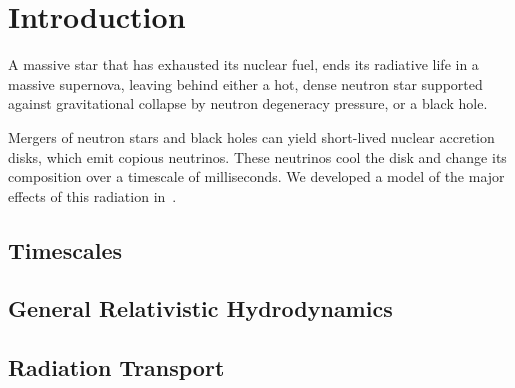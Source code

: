 \chapter{Introduction}
\label{chap:intro}

A massive star that has exhausted its nuclear fuel, ends its radiative life
in a massive supernova, leaving behind either a hot, dense neutron star supported
against gravitational collapse by neutron degeneracy pressure, or a black hole.

Mergers of neutron stars and black holes can yield short-lived nuclear accretion
disks, which emit copious neutrinos. These neutrinos cool the disk and change
its composition over a timescale of milliseconds. We developed a model of the
major effects of this radiation in~\cite{deat2013-leakage}.



\section{Timescales}

\section{General Relativistic Hydrodynamics}

\section{Radiation Transport}
